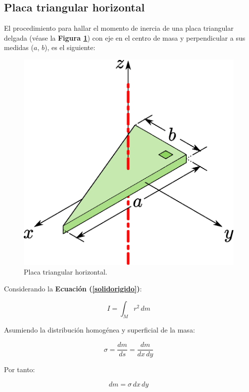 \subsection{Placa triangular horizontal}
El procedimiento para hallar el momento de inercia de una placa triangular
delgada (véase la \textbf{Figura \ref{figura11}}) con eje en el centro de masa y
perpendicular a sus medidas ($a$, $b$), es el siguiente:

\begin{figure}
\centering
\includegraphics[scale=0.5]{resources/f11.eps}
\caption{Placa triangular horizontal.}
\label{figura11}
\end{figure}

Considerando la \textbf{Ecuación (\ref{solidorigido})}:

\begin{equation*}
    I = \int_{M} r^2\, dm
\tag{4}
\end{equation*}

Asumiendo la distribución homogénea y superficial de la masa:

\begin{equation*}
    \sigma = \frac{dm}{ds} = \frac{dm}{dx\, dy}
\end{equation*}

Por tanto:

\begin{equation}
    dm = \sigma\, dx\, dy
\label{dm7}
\end{equation}

